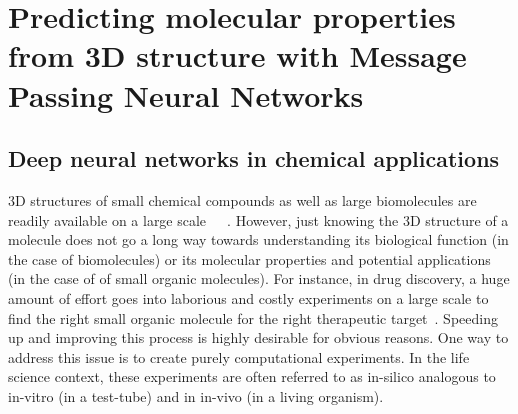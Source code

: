 \section{Predicting molecular properties from 3D structure with Message Passing Neural Networks}
\label{3d-molecules-for-gcnns}

\subsection{Deep neural networks in chemical applications}

3D structures of small chemical compounds as well as large biomolecules are readily available on a large scale~\cite{Ruddigkeit2012}~\cite{Chen2019}~\cite{Ramakrishnan2014}.
However, just knowing the 3D structure of a molecule does not go a long way towards understanding its biological function (in the case of biomolecules) or its molecular properties and potential applications (in the case of of small organic molecules). For instance, in drug discovery, a huge amount of effort goes into laborious and costly experiments on a large scale to find the right small organic molecule for the right therapeutic target~\cite{Fda-drug-discovery}. Speeding up and improving this process is highly desirable for obvious reasons. 
One way to address this issue is to create purely computational experiments. In the life science context, these experiments are often referred to as in-silico analogous to in-vitro (in a test-tube) and in in-vivo (in a living organism).




